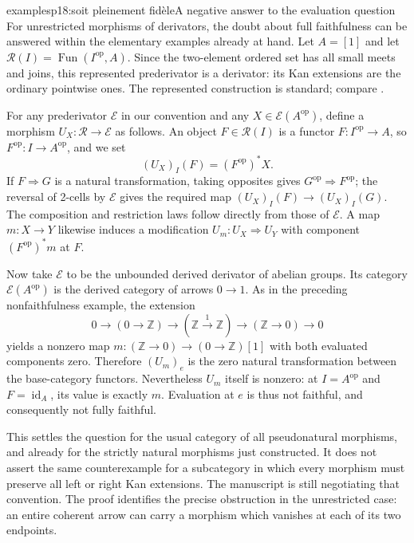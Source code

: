 \begin{dcomment}{examples}{p18:soit pleinement fidèle}{A negative answer to the evaluation question}
For unrestricted morphisms of derivators, the doubt about full faithfulness can be answered within the elementary examples already at hand. Let $A=[1]$ and let $\mathscr R(I)=\operatorname{Fun}(I^{\mathrm{op}},A)$. Since the two-element ordered set has all small meets and joins, this represented prederivator is a derivator: its Kan extensions are the ordinary pointwise ones. The represented construction is standard; compare \citet[Examples~1.2(1) and~1.6]{Groth2013}.

For any prederivator $\mathscr E$ in our convention and any $X\in\mathscr E(A^{\mathrm{op}})$, define a morphism $U_X:\mathscr R\to\mathscr E$ as follows. An object $F\in\mathscr R(I)$ is a functor $F:I^{\mathrm{op}}\to A$, so $F^{\mathrm{op}}:I\to A^{\mathrm{op}}$, and we set
\[
 (U_X)_I(F)=(F^{\mathrm{op}})^*X.
\]
If $F\Rightarrow G$ is a natural transformation, taking opposites gives $G^{\mathrm{op}}\Rightarrow F^{\mathrm{op}}$; the reversal of 2-cells by $\mathscr E$ gives the required map $(U_X)_I(F)\to(U_X)_I(G)$. The composition and restriction laws follow directly from those of $\mathscr E$. A map $m:X\to Y$ likewise induces a modification $U_m:U_X\Rightarrow U_Y$ with component $(F^{\mathrm{op}})^*m$ at $F$.

Now take $\mathscr E$ to be the unbounded derived derivator of abelian groups. Its category $\mathscr E(A^{\mathrm{op}})$ is the derived category of arrows $0\to1$. As in the preceding nonfaithfulness example, the extension
\[
 0\to(0\to\mathbb Z)\to
 (\mathbb Z\xrightarrow{1}\mathbb Z)\to(\mathbb Z\to0)\to0
\]
yields a nonzero map $m:(\mathbb Z\to0)\to(0\to\mathbb Z)[1]$ with both evaluated components zero. Therefore $(U_m)_e$ is the zero natural transformation between the base-category functors. Nevertheless $U_m$ itself is nonzero: at $I=A^{\mathrm{op}}$ and $F=\operatorname{id}_A$, its value is exactly $m$. Evaluation at $e$ is thus not faithful, and consequently not fully faithful.

This settles the question for the usual category of all pseudonatural morphisms, and already for the strictly natural morphisms just constructed. It does not assert the same counterexample for a subcategory in which every morphism must preserve all left or right Kan extensions. The manuscript is still negotiating that convention. The proof identifies the precise obstruction in the unrestricted case: an entire coherent arrow can carry a morphism which vanishes at each of its two endpoints.
\end{dcomment}


